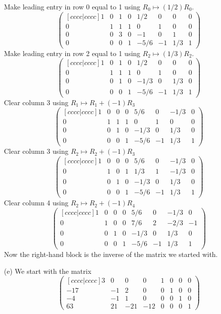 \documentclass{article}
\begin{document}
Make leading entry in row 0 equal to 1 using \(R_0\mapsto (1/2)R_0\).
\[\begin{pmatrix}[ c c c c | c c c c ] 1 & 0 & 1 & 0 & 1/2 & 0 & 0 & 0
\\ 0 & 1 & 1 & 1 & 0 & 1 & 0 & 0 \\ 0 & 0 & 3 & 0 & -1 & 0 & 1 & 0
\\ 0 & 0 & 0 & 1 & -5/6 & -1 & 1/3 & 1 \end{pmatrix}\]Make leading
entry in row 2 equal to 1 using \(R_2\mapsto (1/3)R_2\).
\[\begin{pmatrix}[ c c c c | c c c c ] 1 & 0 & 1 & 0 & 1/2 & 0 & 0 & 0
\\ 0 & 1 & 1 & 1 & 0 & 1 & 0 & 0 \\ 0 & 0 & 1 & 0 & -1/3 & 0 & 1/3 & 0
\\ 0 & 0 & 0 & 1 & -5/6 & -1 & 1/3 & 1 \end{pmatrix}\]Clear column 3
using \(R_1\mapsto R_1+(-1)R_3\)\[\begin{pmatrix}[ c c c c | c c c c ]
1 & 0 & 0 & 0 & 5/6 & 0 & -1/3 & 0 \\ 0 & 1 & 1 & 1 & 0 & 1 & 0 & 0
\\ 0 & 0 & 1 & 0 & -1/3 & 0 & 1/3 & 0 \\ 0 & 0 & 0 & 1 & -5/6 & -1 &
1/3 & 1 \end{pmatrix}\]Clear column 3 using \(R_2\mapsto
R_2+(-1)R_3\)\[\begin{pmatrix}[ c c c c | c c c c ] 1 & 0 & 0 & 0 &
5/6 & 0 & -1/3 & 0 \\ 0 & 1 & 0 & 1 & 1/3 & 1 & -1/3 & 0 \\ 0 & 0 & 1
& 0 & -1/3 & 0 & 1/3 & 0 \\ 0 & 0 & 0 & 1 & -5/6 & -1 & 1/3 & 1
\end{pmatrix}\]Clear column 4 using \(R_2\mapsto
R_2+(-1)R_4\)\[\begin{pmatrix}[ c c c c | c c c c ] 1 & 0 & 0 & 0 &
5/6 & 0 & -1/3 & 0 \\ 0 & 1 & 0 & 0 & 7/6 & 2 & -2/3 & -1 \\ 0 & 0 & 1
& 0 & -1/3 & 0 & 1/3 & 0 \\ 0 & 0 & 0 & 1 & -5/6 & -1 & 1/3 & 1
\end{pmatrix}\]Now the right-hand block is the inverse of the matrix
we started with.


\newpage


(e) We start with the matrix \[\begin{pmatrix}[ c c c c | c c c c ] 3
& 0 & 0 & 0 & 1 & 0 & 0 & 0 \\ -17 & -1 & 2 & 0 & 0 & 1 & 0 & 0 \\ -4
& -1 & 1 & 0 & 0 & 0 & 1 & 0 \\ 63 & 21 & -21 & -12 & 0 & 0 & 0 & 1
\end{pmatrix}\]
\end{document}
